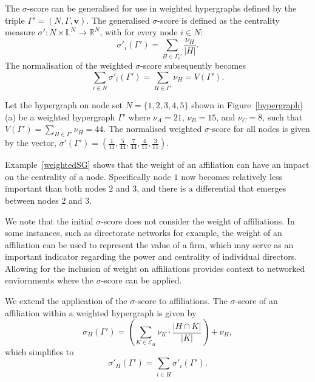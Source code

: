 The $\sigma$-score can be generalised for use in weighted hypergraphs defined by the triple $\Gamma' = (N, \Gamma, \mathbf{v})$. The generalised $\sigma$-score is defined as the centrality measure $\sigma' : N \times \mathbb{L}^{N} \rightarrow \mathbb{R}^{N}$, with for every node $i \in N$:
\begin{equation}
\sigma'_{i}(\Gamma' ) = \sum_{H \in \Gamma_{i}' } \frac{\nu_{H}}{| H |} .
\end{equation}
The normalisation of the weighted $\sigma$-score subsequently becomes
\begin{equation} \label{sigmanorm}
\sum_{i \in N} \sigma'_{i}(\Gamma' ) = \sum_{H \in \Gamma' } \nu_{H} = V(\Gamma').
\end{equation}
\begin{example} \label{weightedSG}
Let the hypergraph on node set $N = \{ 1, 2, 3, 4, 5\}$ shown in Figure~\ref{hypergraph} (a) be a weighted hypergraph $\Gamma'$ where $\nu_{A} = 21$, $\nu_{B} = 15$, and $\nu_{C} = 8$, such that $V(\Gamma') = \sum_{H \in \Gamma'} \nu_{H} = 44$. The normalised weighted $\sigma$-score for all nodes is given by the vector, $\sigma'(\Gamma' ) = ( \frac{1}{11}, \frac{5}{44}, \frac{7}{44}, \frac{4}{11}, \frac{3}{11} )$.
\end{example}
Example~\ref{weightedSG} shows that the weight of an affiliation can have an impact on the centrality of a node. Specifically node $1$ now becomes relatively less important than both nodes $2$ and $3$, and there is a differential that emerges between nodes $2$ and $3$.

We note that the initial $\sigma$-score does not consider the weight of affiliations. In some instances, such as directorate networks for example, the weight of an affiliation can be used to represent the value of a firm, which may serve as an important indicator regarding the power and centrality of individual directors. Allowing for the inclusion of weight on affiliations provides context to networked enviornments where the $\sigma$-score can be applied.

\medskip \noindent We extend the application of the $\sigma$-score to affiliations. The $\sigma$-score of an affiliation within a weighted hypergraph is given by
\begin{equation}
\sigma_{H}(\Gamma') = \left( \sum_{K \in \mathcal{E}_{H}} \nu_{K} \cdot \frac{| H \cap K |}{| K |} \right) + \nu_{H},
\end{equation}
which simplifies to
\begin{equation}
\sigma'_{H}(\Gamma' ) = \sum_{i \in H} \sigma'_{i}(\Gamma ' ).
\end{equation}

